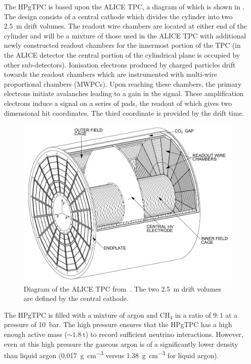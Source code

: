 The HPgTPC is based upon the ALICE TPC, a diagram of which is shown in .
The design consists of a central cathode which divides the cylinder into two \SI{2.5}{\metre} drift volumes.
The readout wire chambers are located at either end of the cylinder and will be a mixture of those used in the ALICE TPC with additional newly constructed readout chambers for the innermost portion of the TPC (in the ALICE detector the central portion of the cylindrical plane is occupied by other sub-detectors).
Ionisation electrons produced by charged particles drift towards the readout chambers which are instrumented with multi-wire proportional chambers (MWPCs).
Upon reaching these chambers, the primary electrons initiate avalanches leading to a gain in the signal.
These amplification electrons induce a signal on a series of pads, the readout of which gives two dimensional hit coordinates.
The third coordinate is provided by the drift time.

\begin{figure}[h]
  \centering
  \includegraphics[width=.8\linewidth]{files/figures/dune_detector/aliceTPC}
  \caption[Diagram of the ALICE TPC]{Diagram of the ALICE TPC from~\cite{alicePaper}. The two \SI{2.5}{\metre} drift volumes are defined by the central cathode.}
  \label{fig:aliceTPC}
\end{figure}

The HPgTPC is filled with a mixture of argon and $\text{CH}_{4}$ in a ratio of $9:1$ at a pressure of \SI{10}{\bar}.
The high pressure ensures that the HPgTPC has a high enough active mass ($\sim\SI{1.8}{\tonne}$) to record sufficient neutrino interactions.
However, even at this high pressure the gaseous argon is of a significantly lower density than liquid argon (\SI{0.017}{\gram\per\cubic\centi\metre} versus \SI{1.38}{\gram\per\cubic\centi\metre} for liquid argon).

